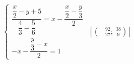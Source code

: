\begin{esercizio}[\Ast]
\begin{enumeratea}
{\item $\left\{\begin{array}{l}
\dfrac{\dfrac{x}{2}-y+5}{\dfrac{4}{3}-\dfrac{5}{6}}=
    x-\dfrac{\dfrac{x}{2}-\dfrac{y}{3}}{2}\\
-x-\dfrac{\dfrac{y}{3}-x}{2}=1\end{array}\right.$
 \hfill $\left[(-{\frac{92}{27}};~\frac{38}{9})\right]$
}
\end{enumeratea}
\end{esercizio}

